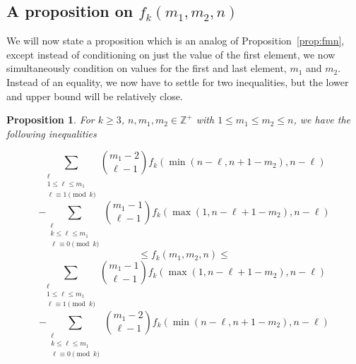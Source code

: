 \documentclass{amsart}
\newtheorem{proposition}[theorem]{Proposition}
\theoremstyle{definition}
\begin{document}
\subsection{A proposition on $f_k(m_1,m_2,n)$} We will now state a proposition which is an analog of Proposition~\ref{prop:fmn}, except instead of conditioning on just the value of the first element, we now simultaneously condition on values for the first and last element, $m_1$ and $m_2$. Instead of an equality, we now have to settle for two inequalities, but the lower and upper bound will be relatively close.

\begin{proposition}\label{prop:fm1m2}
For $k\geq 3$, $n,m_1,m_2\in \mathbb{Z}^+$ with $1\leq m_1\leq m_2\leq n$, we have the following inequalities


\[ \sum_{\substack{\ell\\1\leq \ell \leq m_1\\ \ell\equiv 1 \pmod{k}}}\binom{m_1-2}{\ell-1}f_k\left(\min(n-\ell,n+1-m_2),n-\ell\right)\]\[ -\sum_{\substack{\ell\\k\leq \ell \leq m_1\\ \ell\equiv 0 \pmod{k}}}   \binom{m_1-1}{\ell-1}f_k\left(\max(1,n-\ell+1-m_2),n-\ell\right)\]
\[\leq f_k(m_1,m_2,n)\leq\]
\[ \sum_{\substack{\ell\\1\leq \ell \leq m_1\\ \ell\equiv 1 \pmod{k}}}\binom{m_1-1}{\ell-1}f_k\left(\max(1,n-\ell+1-m_2),n-\ell\right)\]\[-\sum_{\substack{\ell\\k\leq \ell \leq m_1\\ \ell\equiv 0 \pmod{k}}}\binom{m_1-2}{\ell-1}f_k\left(\min(n-\ell,n+1-m_2),n-\ell\right)\]
\end{proposition}
\end{document}

